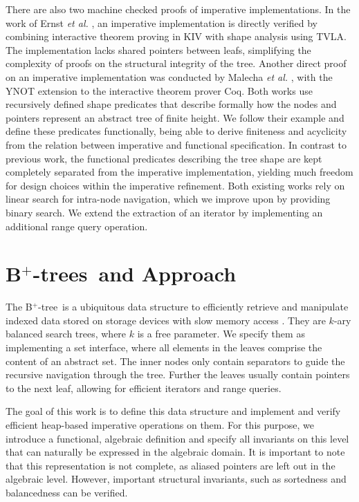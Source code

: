 \documentclass[a4paper,UKenglish,cleveref, autoref, thm-restate]{lipics-v2021}
\newcommand{\btree}{B$^+$-tree}
\newcommand{\btrees}{B$^+$-trees}
\begin{document}
There are also two machine checked proofs of imperative implementations.
In the work of Ernst \emph{et al.} \cite{DBLP:journals/sosym/ErnstSR15},
an imperative implementation is directly verified
by combining interactive theorem proving in KIV
with shape analysis using TVLA.
The implementation lacks shared pointers between leafs,
simplifying the complexity of proofs on the structural integrity of the tree.
Another direct proof on an imperative implementation
was conducted by Malecha \emph{et al.} \cite{DBLP:conf/popl/MalechaMSW10}, with the YNOT
extension to the interactive theorem prover Coq.
Both works use recursively defined shape predicates
that describe formally how the nodes and pointers
represent an abstract tree of finite height.
We follow their example and define these predicates functionally,
being able to derive finiteness and acyclicity from the relation between imperative and functional specification.
In contrast to previous work, the functional predicates describing the tree shape are kept
completely separated from the imperative implementation,
yielding much freedom for design choices within the imperative refinement.
Both existing works rely on linear search for intra-node navigation,
which we improve upon by providing binary search.
We extend the extraction of an iterator
by implementing an additional range query operation. 


\section{\btrees\ and Approach}
\label{sec:approach}

The \btree\ is a ubiquitous data structure to efficiently retrieve and manipulate
indexed data stored on storage devices with slow memory access \cite{DBLP:journals/csur/Comer79}.
They are $k$-ary balanced search trees, where $k$ is a free parameter.
We specify them as implementing a set interface,
where all elements in the leaves comprise the content of an abstract set.
The inner nodes only contain separators to guide the recursive navigation through the tree.
Further the leaves usually contain pointers
to the next leaf, allowing for efficient iterators and range queries.

The goal of this work is to define this data structure
and implement and verify efficient heap-based imperative operations on them.
For this purpose, we introduce a functional, algebraic definition and
specify all invariants on this level that can naturally be expressed in the algebraic domain.
It is important to note that this representation is not complete,
as aliased pointers are left out in the algebraic level.
However, important structural invariants, such as sortedness and balancedness
can be verified.
\end{document}
